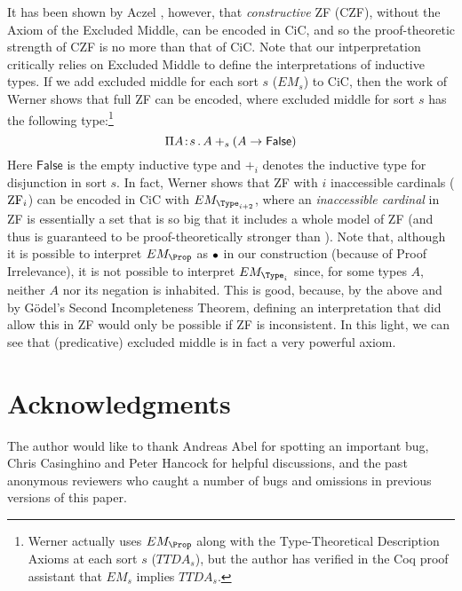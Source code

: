 \documentclass{article}
\begin{document}
It has been shown by Aczel \cite{aczel77}, however, that
\emph{constructive} ZF (CZF), without the Axiom of the Excluded
Middle, can be encoded in CiC, and so the proof-theoretic strength of
CZF is no more than that of CiC. Note that our intperpretation
critically relies on Excluded Middle to define the interpretations
of inductive types. If we add excluded middle for
each sort $s$ ($EM_s$) to CiC, then the work of Werner \cite{werner97}
shows that full ZF can be encoded, where excluded middle for sort $s$ has
the following type:\footnote{Werner actually uses $EM_{\Prop}$ along
  with the Type-Theoretical Description Axioms at each sort $s$
  ($TTDA_s$), but the author has verified in the Coq proof assistant
  that $EM_s$ implies $TTDA_s$.}
\[
\Pi A\!:\!s\,.\,A +_s (A \to \mathsf{False})
\]
Here $\mathsf{False}$ is the empty inductive type and $+_i$ denotes
the inductive type for disjunction in sort $s$.  In fact, Werner shows
that ZF with $i$ inaccessible cardinals ($\text{ZF}_{i}$) can be encoded in CiC
with $EM_{\Type_{i+2}}$, where an \emph{inaccessible cardinal} in ZF
is essentially a set that is so big that it includes a whole model of
ZF (and thus \ZFi[i+1] is guaranteed to be proof-theoretically
stronger than \ZFi).  Note that, although it is possible to interpret
$EM_{\Prop}$ as $\bullet$ in our construction (because of Proof
Irrelevance), it is not possible to interpret $EM_{\Type_i}$ since,
for some types $A$, neither $A$ nor its negation is inhabited.  This
is good, because, by the above and by G\"{o}del's Second
Incompleteness Theorem, defining an interpretation that did allow this
in ZF would only be possible if ZF is inconsistent.  In this light, we can
see that (predicative) excluded middle is in fact a very powerful
axiom.


\section*{Acknowledgments}
The author would like to thank Andreas Abel for spotting an important
bug, Chris Casinghino and Peter Hancock for helpful discussions, and
the past anonymous reviewers who caught a number of bugs and omissions
in previous versions of this paper.





\end{document}
